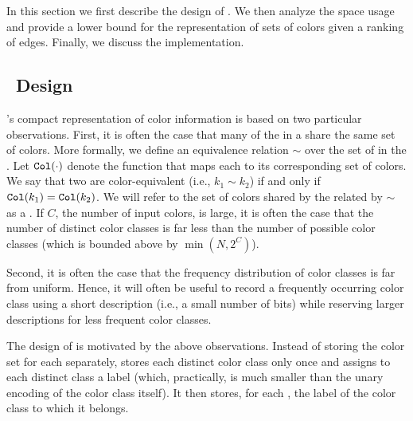 In this section we first describe the design of \system. We then analyze the
space usage and provide a lower bound for the representation of sets of colors given
a ranking of \dbg edges. Finally, we discuss the \system implementation.

\subsection{~Design}
\label{design}

\system's compact representation of color information is based on two particular
observations. First, it is often the case that many of the \kmers in a \cdbg
share the same set of colors. More formally, we define an equivalence relation
$\sim$ over the set of \kmers in the \dbg. Let $\texttt{Col}(\cdot)$ denote the
function that maps each \kmer to its corresponding set of colors. We say that
two \kmers are color-equivalent (i.e., $k_1 \sim k_2$) if and only if
$\texttt{Col}(k_1) = \texttt{Col}(k_2)$. We will refer to the set of colors shared by the
\kmers related by $\sim$ as a . If $C$, the number of input
colors, is large, it is often the case that the number of distinct color classes
is far less than the number of possible color classes (which is bounded above by
$\min(N,2^C)$).

Second, it is often the case that the frequency distribution of color classes
is far from uniform.  Hence, it will often be useful to record a frequently
occurring color class using a short description (i.e., a small number of bits)
while reserving larger descriptions for less frequent color classes.


The design of \system is motivated by the above observations. Instead of storing
the color set for each \kmer separately, \system stores each distinct color
class only once and assigns to each distinct class a label (which, practically,
is much smaller than the unary encoding of the color class itself).
%
%
%
It then stores, for each \kmer, the label of the color class to which it
belongs. 
%

